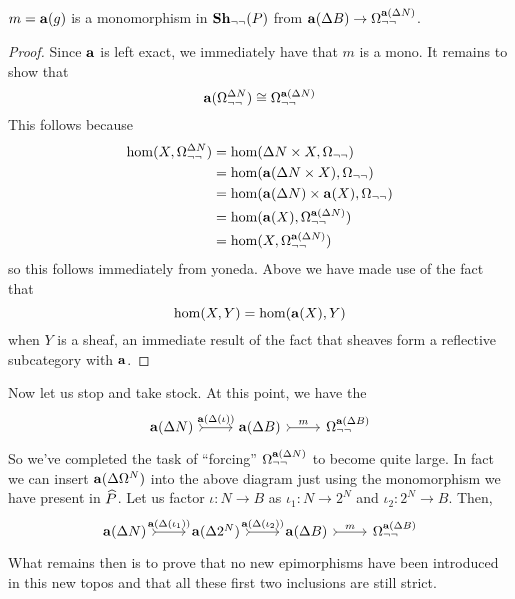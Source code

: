 \begin{cor}
  $m = \sheafify(g)$ is a monomorphism in $\sheaves[\neg\neg]{P}$ from
  $\sheafify(\Delta B) \to \Omega_{\neg\neg}^{\sheafify(\Delta N)}$.
\end{cor}
\begin{proof}
  Since $\sheafify$ is left exact, we immediately have that $m$ is a
  mono. It remains to show that
  \[
    \sheafify(\Omega_{\neg\neg}^{\Delta N}) \cong
    \Omega_{\neg\neg}^{\sheafify(\Delta N)}
  \]
  This follows because
  \begin{align*}
    \hom(X, \Omega_{\neg\neg}^{\Delta N}) &=
        \hom(\Delta N \times X, \Omega_{\neg\neg})\\
     &= \hom(\sheafify(\Delta N \times X), \Omega_{\neg\neg})\\
     &= \hom(\sheafify(\Delta N) \times \sheafify(X), \Omega_{\neg\neg})\\
     &= \hom(\sheafify(X), \Omega_{\neg\neg}^{\sheafify(\Delta N) })\\
     &= \hom(X, \Omega_{\neg\neg}^{\sheafify(\Delta N) })\\
  \end{align*}
  so this follows immediately from yoneda. Above we have made use of
  the fact that
  \[
    \hom(X, Y) = \hom(\sheafify(X), Y)
  \]
  when $Y$ is a sheaf, an immediate result of the fact that sheaves
  form a reflective subcategory with $\sheafify$.
\end{proof}

Now let us stop and take stock. At this point, we have the
\[
  \begin{tikzcd}
    \sheafify(\Delta N) \ar[r, rightarrowtail, "\sheafify(\Delta(\iota))"] &
    \sheafify(\Delta B)  \ar[r, rightarrowtail, "m"] &
    \Omega_{\neg\neg}^{\sheafify(\Delta B)}
  \end{tikzcd}
\]
So we've completed the task of ``forcing''
$\Omega_{\neg\neg}^{\sheafify(\Delta N)}$ to become quite large. In
fact we can insert $\sheafify(\Delta \Omega^N)$ into the above diagram
just using the monomorphism we have present in $\presheaf{P}$. Let us
factor $\iota : N \to B$ as $\iota_1 : N \to 2^N$ and
$\iota_2 : 2^N \to B$. Then,
\[
  \begin{tikzcd}
    \sheafify(\Delta N) \ar[r, rightarrowtail, "\sheafify(\Delta(\iota_1))"] &
    \sheafify(\Delta 2^N) \ar[r, rightarrowtail, "\sheafify(\Delta(\iota_2))"] &
    \sheafify(\Delta B) \ar[r, rightarrowtail, "m"] &
    \Omega_{\neg\neg}^{\sheafify(\Delta B)}
  \end{tikzcd}
\]
What remains then is to prove that no new epimorphisms have been
introduced in this new topos and that all these first two inclusions
are still strict.
